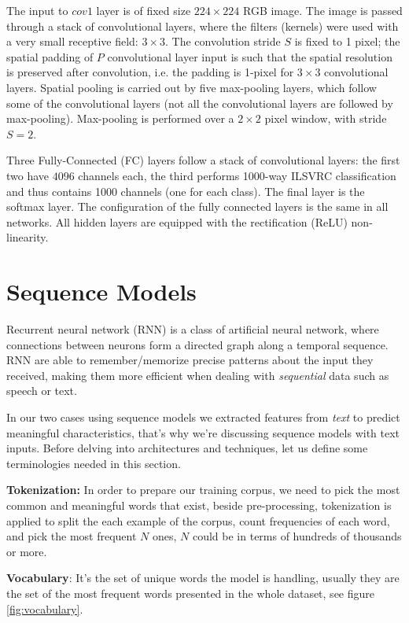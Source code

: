 The input to $cov1$ layer is of fixed size $224 \times 224$ RGB image. The image is passed through a stack of convolutional layers, where the filters (kernels) were used with a very small receptive field: $3 \times 3$. The convolution stride $S$ is fixed to 1 pixel; the spatial padding of $P$ convolutional layer input is such that the spatial resolution is preserved after convolution, i.e. the padding is 1-pixel for $3 \times 3$ convolutional layers. Spatial pooling is carried out by five max-pooling layers, which follow some of the convolutional layers (not all the convolutional layers are followed by max-pooling). Max-pooling is performed over a $2 \times 2$ pixel window, with stride $S = 2$.

Three Fully-Connected (FC) layers follow a stack of convolutional layers: the first two have $4096$ channels each, the third performs 1000-way ILSVRC classification and thus contains 1000 channels (one for each class). The final layer is the softmax layer. The configuration of the fully connected layers is the same in all networks. All hidden layers are equipped with the rectification (ReLU) non-linearity. 
\newpage




\section{Sequence Models}
\label{Sequence Models}
Recurrent neural network (RNN) is a class of artificial neural network, where connections between neurons form a directed graph along a temporal sequence. RNN are able to remember/memorize precise patterns about the input they received, making them more efficient when dealing with \emph{sequential} data such as speech or text.

In our two cases using sequence models we extracted features from \emph{text} to predict meaningful characteristics, that's why we're discussing sequence models with text inputs. Before delving into architectures and techniques, let us define some terminologies needed in this section.

\textbf{Tokenization:} In order to prepare our training corpus, we need to pick the most common and meaningful words that exist, beside pre-processing, tokenization is applied to split the each example of the corpus, count frequencies of each word, and pick the most frequent $N$ ones, $N$ could be in terms of hundreds of thousands or more.

\textbf{Vocabulary}: It's the set of unique words the model is handling, usually they are the set of the most frequent words presented in the whole dataset, see figure \ref{fig:vocabulary}.

